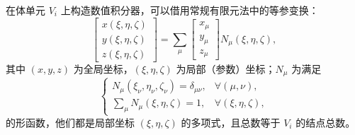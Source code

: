 在体单元 $V_{i}$ 上构造数值积分器，可以借用常规有限元法中的等参变换：
\begin{equation}
\begin{bmatrix}x(\xi,\eta,\zeta)\\
y(\xi,\eta,\zeta)\\
z(\xi,\eta,\zeta)
\end{bmatrix}=\sum_{\mu}\begin{bmatrix}x_{\mu}\\
y_{\mu}\\
z_{\mu}
\end{bmatrix}N_{\mu}(\xi,\eta,\zeta),\label{eq:isoparametric}
\end{equation}
其中 $(x,y,z)$ 为全局坐标，$(\xi,\eta,\zeta)$ 为局部（参数）坐标；$N_{\mu}$ 为满足
\begin{equation}
\begin{cases}
N_{\mu}(\xi_{\nu},\eta_{\nu},\zeta_{\nu})=\delta_{\mu\nu}, & \forall(\mu,\nu),\\
\sum_{\mu}N_{\mu}(\xi,\eta,\zeta)=1, & \forall(\xi,\eta,\zeta),
\end{cases}
\end{equation}
的形函数，他们都是局部坐标 $(\xi,\eta,\zeta)$ 的多项式，且总数等于 $V_{i}$ 的结点总数。

